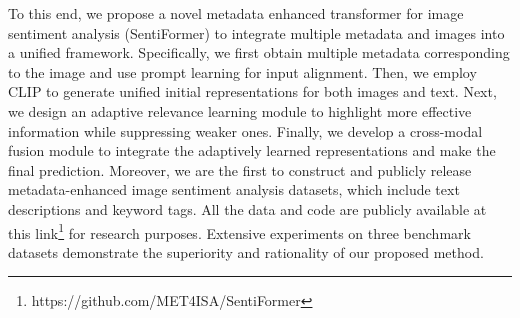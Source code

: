 To this end, we propose a novel metadata enhanced transformer for image sentiment analysis (SentiFormer) to integrate multiple metadata and images into a unified framework.
Specifically, we first obtain multiple metadata corresponding to the image and use prompt learning for input alignment. 
Then, we employ CLIP to generate unified initial representations for both images and text. Next, we design an adaptive relevance learning module to highlight more effective information while suppressing weaker ones. Finally, we develop a cross-modal fusion module to integrate the adaptively learned representations and make the final prediction.
Moreover, we are the first to construct and publicly release metadata-enhanced image sentiment analysis datasets, which include text descriptions and keyword tags. 
All the data and code are publicly available at this link\footnote{https://github.com/MET4ISA/SentiFormer} for research purposes.
Extensive experiments on three benchmark datasets demonstrate the superiority and rationality of our proposed method.
% 

